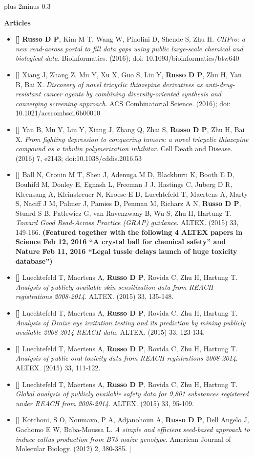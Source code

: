 \documentclass{article} %
\def\bf{\bfseries}
\def\sf{\sffamily}
\newlength\sidebarwidth
\newcommand{\smalltopic}[2]%
	 {\pagebreak[2]%
	 \vskip 1\baselineskip plus 2\baselineskip minus 0.3\baselineskip
	 \begin{minipage}{\textwidth}
         \phantomsection\addcontentsline{toc}{subsection}{#1}%
         \nopagebreak\hspace{0in}%
         \nopagebreak\begin{minipage}[t]{\sidebarwidth - .2cm}
         \raggedleft \bf\sf %
	 \textcolor{dark_blue}{\large #1}%
	 \end{minipage}%
	 \hfill
	 \begin{minipage}[t]{\linewidth - \sidebarwidth}
	 \nopagebreak{%
	    \rule{\linewidth}{.5pt}%
	    \vspace{.1\baselineskip}%
	    }%
	    #2
	 \end{minipage}
	 \end{minipage}}
\begin{document}
\newcommand{\article}{\item[{\bf \textcolor{myblue}{[\stepcounter{ArticleNumber}\arabic{ArticleNumber}]}}]}
\smalltopic{Articles}{
  \begin{itemize}[leftmargin=0ex, itemsep=0ex, labelindent=-4ex, parsep=.5ex]
    \article \textbf{Russo D P}, Kim M T, Wang W, Pinolini D, Shende S, Zhu H. \textit{CIIPro: a new read-across portal to fill data gaps using public large-scale chemical and biological data}. Bioinformatics. (2016); doi: 10.1093/bioinformatics/btw640  
    \article Xiang J, Zhang Z, Mu Y, Xu X, Guo S, Liu Y, \textbf{Russo D P}, Zhu H, Yan B, Bai X. \textit{Discovery of novel tricyclic thiazepine derivatives as anti-drug-resistant cancer agents by combining diversity-oriented synthesis and converging 
	screening approach}. ACS Combinatorial Science. (2016); doi: 10.1021/acscombsci.6b00010
    \article Yan B, Mu Y, Liu Y, Xiang J, Zhang Q, Zhai S, \textbf{Russo D P}, Zhu H, Bai X. \textit{From fighting depression to conquering tumors: a novel tricyclic thiazepine compound as a tubulin polymerization inhibitor}. 
	Cell Death and Disease. (2016) 7, e2143; doi:10.1038/cddis.2016.53  
    \article Ball N, Cronin M T, Shen J, Adenuga M D, Blackburn K, Booth E D, Bouhifd M, Donley E, Egnash L, Freeman J J, Hastings C, Juberg D R, Kleensang A, Kleinstreuer N, Kroese E D, Luechtefeld T, Maertens A, Marty S, Naciff J M, Palmer J, Pamies D,
           Penman M, Richarz A N, \textbf{Russo D P}, Stuard S B, Patlewicz G, van Ravenzwaay B, Wu S, Zhu H, Hartung T. \textit{Toward Good Read-Across Practice (GRAP) guidance}. ALTEX. (2015) 33, 149-166. \textbf{(Featured together with the following 
	4 ALTEX papers in Science Feb 12, 2016 “A crystal ball for chemical safety” and Nature Feb 11, 2016 “Legal tussle delays launch of huge toxicity database”)}
     \article Luechtefeld T, Maertens A, \textbf{Russo D P}, Rovida C, Zhu H, Hartung T. \textit{Analysis of publicly available skin sensitization data from REACH registrations 2008-2014}. ALTEX. (2015) 33, 135-148.
     \article Luechtefeld T, Maertens A, \textbf{Russo D P}, Rovida C, Zhu H, Hartung T. \textit{Analysis of Draize eye irritation testing and its prediction by mining publicly available 2008-2014 REACH data}. ALTEX. (2015) 33, 123-134.
     \article Luechtefeld T, Maertens A, \textbf{Russo D P}, Rovida C, Zhu H, Hartung T. \textit{Analysis of public oral toxicity data from REACH registrations 2008-2014}. ALTEX. (2015) 33, 111-122.
     \article Luechtefeld T, Maertens A, \textbf{Russo D P}, Rovida C, Zhu H, Hartung T. \textit{Global analysis of publicly available safety data for 9,801 substances registered under REACH from 2008-2014}. ALTEX. (2015) 33, 95-109.  
     \article Kotchoni, S O, Noumavo, P A, Adjanohoun A, \textbf{Russo D P}, Dell Angelo J, Gachomo E W, Baba-Moussa L. \textit{A simple and efficient seed-based approach to induce callus production from B73 maize genotype}. American Journal of Molecular Biology. (2012) 2, 380-385.   ]	
	
  \end{itemize}
}
\end{document}
